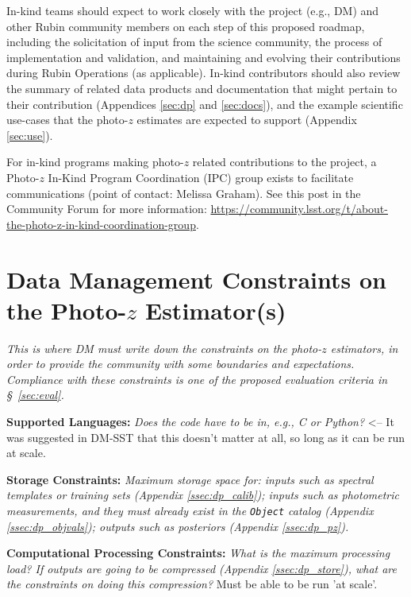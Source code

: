 \documentclass[DM,lsstdraft,toc]{lsstdoc}
\begin{document}
In-kind teams should expect to work closely with the project (e.g., DM) and other Rubin community members on each step of this proposed roadmap, including the solicitation of input from the science community, the process of implementation and validation, and maintaining and evolving their contributions during Rubin Operations (as applicable).
In-kind contributors should also review the summary of related data products and documentation that might pertain to their contribution (Appendices \ref{sec:dp} and  \ref{sec:docs}), and the example scientific use-cases that the photo-$z$ estimates are expected to support (Appendix \ref{sec:use}).

For in-kind programs making photo-$z$ related contributions to the project, a Photo-$z$ In-Kind Program Coordination (IPC) group exists to facilitate communications (point of contact: Melissa Graham). See this post in the Community Forum for more information: \url{https://community.lsst.org/t/about-the-photo-z-in-kind-coordination-group}.



\clearpage
\section{Data Management Constraints on the Photo-$z$ Estimator(s)}\label{sec:dmcon}

\textit{This is where DM must write down the constraints on the photo-$z$ estimators, in order to provide the community with some boundaries and expectations. Compliance with these constraints is one of the proposed evaluation criteria in \S~\ref{sec:eval}.}

\textbf{Supported Languages: } \textit{Does the code have to be in, e.g., C or Python?} <-- It was suggested in DM-SST that this doesn't matter at all, so long as it can be run at scale.

\textbf{Storage Constraints: } \textit{Maximum storage space for: inputs such as spectral templates or training sets (Appendix \ref{ssec:dp_calib}); inputs such as photometric measurements, and they must already exist in the {\tt Object} catalog (Appendix \ref{ssec:dp_objvals}); outputs such as posteriors (Appendix \ref{ssec:dp_pz}).}

\textbf{Computational Processing Constraints: } \textit{What is the maximum processing load? If outputs are going to be compressed (Appendix \ref{ssec:dp_store}), what are the constraints on doing this compression?} Must be able to be run 'at scale'.
\end{document}
